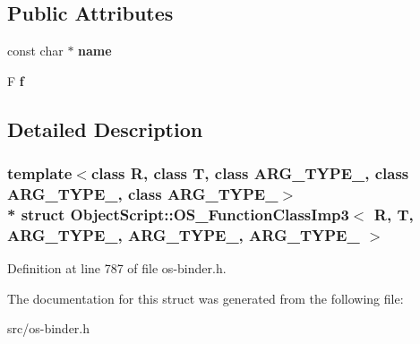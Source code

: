 \subsection*{Public Attributes}
\begin{DoxyCompactItemize}
\item 
const char $\ast$ {\bfseries name}\hypertarget{struct_object_script_1_1_o_s___function_class_imp3_a31ca722e4cf174c5c021d6b23c9c4d82}{}\label{struct_object_script_1_1_o_s___function_class_imp3_a31ca722e4cf174c5c021d6b23c9c4d82}

\item 
F {\bfseries f}\hypertarget{struct_object_script_1_1_o_s___function_class_imp3_ac97b340c81628e18bde64371f98abef8}{}\label{struct_object_script_1_1_o_s___function_class_imp3_ac97b340c81628e18bde64371f98abef8}

\end{DoxyCompactItemize}


\subsection{Detailed Description}
\subsubsection*{template$<$class R, class T, class A\+R\+G\+\_\+\+T\+Y\+P\+E\+\_, class A\+R\+G\+\_\+\+T\+Y\+P\+E\+\_, class A\+R\+G\+\_\+\+T\+Y\+P\+E\+\_$>$\\*
struct Object\+Script\+::\+O\+S\+\_\+\+Function\+Class\+Imp3$<$ R, T, A\+R\+G\+\_\+\+T\+Y\+P\+E\+\_, A\+R\+G\+\_\+\+T\+Y\+P\+E\+\_, A\+R\+G\+\_\+\+T\+Y\+P\+E\+\_ $>$}



Definition at line 787 of file os-\/binder.\+h.



The documentation for this struct was generated from the following file\+:\begin{DoxyCompactItemize}
\item 
src/os-\/binder.\+h\end{DoxyCompactItemize}
